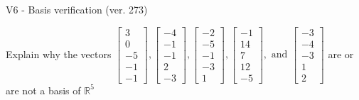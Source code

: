 \begin{exercise}
  \begin{exerciseTitle}V6 - Basis verification (ver. 273)\end{exerciseTitle}
  \begin{exerciseStatement}
    Explain why the vectors \(\left[\begin{array}{r}
3 \\
0 \\
-5 \\
-1 \\
-1
\end{array}\right] , \left[\begin{array}{r}
-4 \\
-1 \\
-1 \\
2 \\
-3
\end{array}\right] , \left[\begin{array}{r}
-2 \\
-5 \\
-1 \\
-3 \\
1
\end{array}\right] , \left[\begin{array}{r}
-1 \\
14 \\
7 \\
12 \\
-5
\end{array}\right] , \text{ and } \left[\begin{array}{r}
-3 \\
-4 \\
-3 \\
1 \\
2
\end{array}\right]\) are or are not a basis of \(\mathbb{R}^5\)	



\end{exerciseStatement}
\end{exercise}

